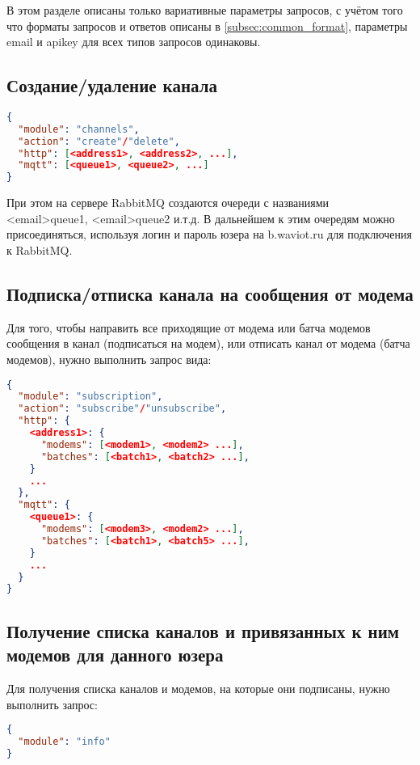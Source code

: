 В этом разделе описаны только вариативные параметры запросов, с учётом того что форматы запросов и ответов описаны в \ref{subsec:common_format}, параметры email и apikey для всех типов запросов одинаковы.

\subsection{Создание/удаление канала}

\begin{lstlisting}[language=json,firstnumber=1]
{
  "module": "channels",
  "action": "create"/"delete",
  "http": [<address1>, <address2>, ...],
  "mqtt": [<queue1>, <queue2>, ...]
}
\end{lstlisting}

При этом на сервере RabbitMQ создаются очереди с названиями <email>\textunderscore queue1, <email>\textunderscore queue2 и.т.д. В дальнейшем к этим очередям можно присоединяться, используя логин и пароль юзера на b.waviot.ru для подключения к RabbitMQ.

\subsection{Подписка/отписка канала на сообщения от модема}

Для того, чтобы направить все приходящие от модема или батча модемов сообщения в канал (подписаться на модем), или отписать канал от модема (батча модемов), нужно выполнить запрос вида:

\begin{lstlisting}[language=json,firstnumber=1]
{
  "module": "subscription",
  "action": "subscribe"/"unsubscribe",
  "http": {
    <address1>: {
      "modems": [<modem1>, <modem2> ...],
      "batches": [<batch1>, <batch2> ...],
    }
    ...
  },
  "mqtt": {
    <queue1>: {
      "modems": [<modem3>, <modem2> ...],
      "batches": [<batch1>, <batch5> ...],
    }
    ...
  }
}
\end{lstlisting}


\subsection{Получение списка каналов и привязанных к ним модемов для данного юзера}

Для получения списка каналов и модемов, на которые они подписаны, нужно выполнить запрос:

\begin{lstlisting}[language=json,firstnumber=1]
{
  "module": "info"
}
\end{lstlisting}

